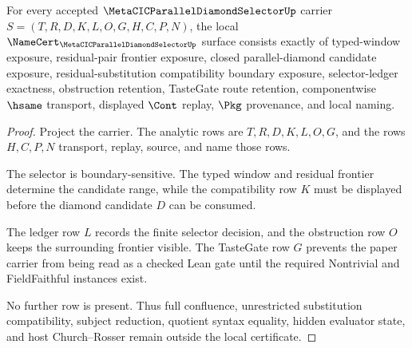 \begin{theorem}
\label{thm:metacic-parallel-diamond-selector-obligations}
For every accepted $\MetaCICParallelDiamondSelectorUp$ carrier $S=(T,R,D,K,L,O,G,H,C,P,N)$, the local $\NameCert_{\MetaCICParallelDiamondSelectorUp}$ surface consists exactly of typed-window exposure, residual-pair frontier exposure, closed parallel-diamond candidate exposure, residual-substitution compatibility boundary exposure, selector-ledger exactness, obstruction retention, TasteGate route retention, componentwise $\hsame$ transport, displayed $\Cont$ replay, $\Pkg$ provenance, and local naming.
\end{theorem}
\begin{proof}
Project the carrier. The analytic rows are $T,R,D,K,L,O,G$, and the rows $H,C,P,N$ transport, replay, source, and name those rows.

The selector is boundary-sensitive. The typed window and residual frontier determine the candidate range, while the compatibility row $K$ must be displayed before the diamond candidate $D$ can be consumed.

The ledger row $L$ records the finite selector decision, and the obstruction row $O$ keeps the surrounding frontier visible. The TasteGate row $G$ prevents the paper carrier from being read as a checked Lean gate until the required Nontrivial and FieldFaithful instances exist.

No further row is present. Thus full confluence, unrestricted substitution compatibility, subject reduction, quotient syntax equality, hidden evaluator state, and host Church--Rosser remain outside the local certificate.
\end{proof}

